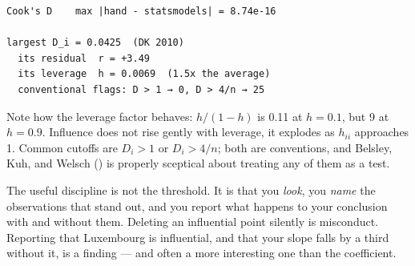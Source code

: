 \documentclass[
  letterpaper,
  10pt,
  twoside,
  openright,
  numbers=noenddot,
  chapterprefix=true]{scrbook}
\begin{document}
\begin{verbatim}
Cook's D    max |hand - statsmodels| = 8.74e-16

largest D_i = 0.0425  (DK 2010)
  its residual  r = +3.49
  its leverage  h = 0.0069  (1.5x the average)
  conventional flags: D > 1 → 0, D > 4/n → 25
\end{verbatim}

Note how the leverage factor behaves: \(h/(1-h)\) is 0.11 at
\(h = 0.1\), but 9 at \(h = 0.9\). Influence does not rise gently with
leverage, it explodes as \(h_{ii}\) approaches 1. Common cutoffs are
\(D_i > 1\) or \(D_i > 4/n\); both are conventions, and Belsley, Kuh,
and Welsch () is properly sceptical
about treating any of them as a test.

The useful discipline is not the threshold. It is that you \emph{look},
you \emph{name} the observations that stand out, and you report what
happens to your conclusion with and without them. Deleting an
influential point silently is misconduct. Reporting that Luxembourg is
influential, and that your slope falls by a third without it, is a
finding --- and often a more interesting one than the coefficient.
\end{document}

